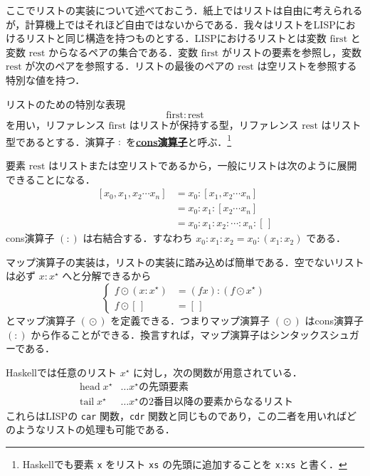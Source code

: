 \documentclass[a4paper,twocolumn]{jsbook}
\newcommand{\programminglanguage}[1]{\textsf{#1}}
\newcommand{\haskell}{\programminglanguage{Haskell}}
\newcommand{\lisp}{\programminglanguage{LISP}}
\newcommand{\keyword}[1]{{\underline{\textbf{#1}}}}
\newcommand{\code}[1]{\texttt{#1}}
\newcommand{\mEmptyList}{{[\,]}}
\newcommand{\mSpecialVar}[1]{\mathrm{#1}} %
\newcommand{\mFirstVar}{\mSpecialVar{first}}
\newcommand{\mRestVar}{\mSpecialVar{rest}}
\newcommand{\mSpecialFunc}[1]{\mathrm{#1}}
\DeclareMathOperator{\mHead}{\mSpecialFunc{head}}
\DeclareMathOperator{\mTail}{\mSpecialFunc{tail}}
\DeclareMathOperator{\mMapList}{\odot}
\newcommand{\mListWith}[1]{\left[#1\right]}
\newcommand{\mList}[1]{{#1}^\mathrm{\star}}
\begin{document}
ここでリストの実装について述べておこう．紙上ではリストは自由に考えられるが，計算機上ではそれほど自由ではないからである．我々はリストを\lisp におけるリストと同じ構造を持つものとする．\lisp におけるリストとは変数 $\mFirstVar$ と変数 $\mRestVar$ からなるペアの集合である．変数 $\mFirstVar$ がリストの要素を参照し，変数 $\mRestVar$ が次のペアを参照する．リストの最後のペアの $\mRestVar$ は空リストを参照する特別な値を持つ．

リストのための特別な表現
\begin{equation}
\mFirstVar:\mRestVar
\end{equation}
を用い，リファレンス $\mFirstVar$ はリストが保持する型，リファレンス $\mRestVar$ はリスト型であるとする．演算子 $:$ を\keyword{cons演算子}と呼ぶ．\footnote{\haskell でも要素 \code{x} をリスト \code{xs} の先頭に追加することを \code{x:xs} と書く．}

要素 $\mRestVar$ はリストまたは空リストであるから，一般にリストは次のように展開できることになる．
\begin{align}
\mListWith{x_0,x_1,x_2\dotsb x_n}
  &=x_0:\mListWith{x_1,x_2\dotsb x_n}\\
  &=x_0:x_1:\mListWith{x_2\dotsb x_n}\\
  &=x_0:x_1:x_2:\dotsb:x_n:\mEmptyList
\end{align}
cons演算子 $(:)$ は右結合する．すなわち $x_0:x_1:x_2=x_0:(x_1:x_2)$ である．

マップ演算子の実装は，リストの実装に踏み込めば簡単である．空でないリストは必ず $x:\mList{x}$ へと分解できるから
\begin{equation}
\left\{
\begin{aligned}
f\mMapList{}(x:\mList{x})
  &=(fx):(f\mMapList\mList{x})\\
f\mMapList\mEmptyList
  &=\mEmptyList
\end{aligned}
\right.
\end{equation}
とマップ演算子 $(\mMapList)$ を定義できる．つまりマップ演算子 $(\mMapList)$ はcons演算子 $(:)$ から作ることができる．換言すれば，マップ演算子はシンタックスシュガーである．

\haskell では任意のリスト $\mList{x}$ に対し，次の関数が用意されている．
\begin{align*}
\mHead\mList{x}&\dots\text{$\mList{x}$の先頭要素}\\
\mTail\mList{x}&\dots\text{$\mList{x}$の2番目以降の要素からなるリスト}
\end{align*}
これらは\lisp  の \code{car} 関数，\code{cdr} 関数と同じものであり，この二者を用いればどのようなリストの処理も可能である．
\end{document}

